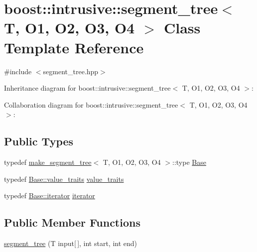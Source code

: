 \hypertarget{classboost_1_1intrusive_1_1segment__tree}{}\section{boost\+:\+:intrusive\+:\+:segment\+\_\+tree$<$ T, O1, O2, O3, O4 $>$ Class Template Reference}
\label{classboost_1_1intrusive_1_1segment__tree}


{\ttfamily \#include $<$segment\+\_\+tree.\+hpp$>$}



Inheritance diagram for boost\+:\+:intrusive\+:\+:segment\+\_\+tree$<$ T, O1, O2, O3, O4 $>$\+:


Collaboration diagram for boost\+:\+:intrusive\+:\+:segment\+\_\+tree$<$ T, O1, O2, O3, O4 $>$\+:
\subsection*{Public Types}
\begin{DoxyCompactItemize}
\item 
typedef \hyperlink{structboost_1_1intrusive_1_1make__segment__tree}{make\+\_\+segment\+\_\+tree}$<$ T, O1, O2, O3, O4 $>$\+::type \hyperlink{classboost_1_1intrusive_1_1segment__tree_a56984f6fac5fb61618c53ca07704cf45}{Base}
\item 
typedef \hyperlink{classboost_1_1intrusive_1_1segment__tree__impl_a929c1b3f1e6bb851a911b9b54a4c0dc2}{Base\+::value\+\_\+traits} \hyperlink{classboost_1_1intrusive_1_1segment__tree_aaff3016f655ec2b1dfe44282913cefea}{value\+\_\+traits}
\item 
typedef \hyperlink{classboost_1_1intrusive_1_1segment__tree__impl_a9f1be9b01be5078fb59b2e34520b374a}{Base\+::iterator} \hyperlink{classboost_1_1intrusive_1_1segment__tree_a20e4825aed9b33d2de0b7f4177bacd7b}{iterator}
\end{DoxyCompactItemize}
\subsection*{Public Member Functions}
\begin{DoxyCompactItemize}
\item 
\hyperlink{classboost_1_1intrusive_1_1segment__tree_a30f63674d219804557316b5c58154d5c}{segment\+\_\+tree} (T input\mbox{[}$\,$\mbox{]}, int start, int end)
\end{DoxyCompactItemize}



